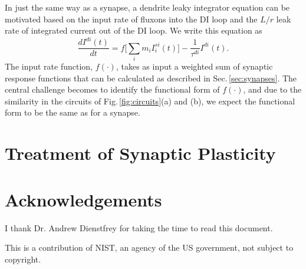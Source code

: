 \documentclass[]{article}
\begin{document}
In just the same way as a synapse, a dendrite leaky integrator equation can be motivated based on the input rate of fluxons into the DI loop and the $L/r$ leak rate of integrated current out of the DI loop. We write this equation as 
\begin{equation}
\label{eq:I_dr}
\frac{dI^{di}(t)}{dt} = f\bigg[\sum_i m_i I_i^{si}(t)\bigg]-\frac{1}{\tau^{di}}I^{di}(t).
\end{equation}
The input rate function, $f(\cdot)$, takes as input a weighted sum of synaptic response functions that can be calculated as described in Sec.\,\ref{sec:synapses}. The central challenge becomes to identify the functional form of $f(\cdot)$, and due to the similarity in the circuits of Fig.\,\ref{fig:circuits}(a) and (b), we expect the functional form to be the same as for a synapse.


\section{\label{sec:synaptic_plasticity}Treatment of Synaptic Plasticity}


\section{Acknowledgements}
I thank Dr. Andrew Dienstfrey for taking the time to read this document.

\vspace{0.5em}
\noindent This is a contribution of NIST, an agency of the US government, not subject to copyright.
	
\newpage
\appendix




\end{document}
